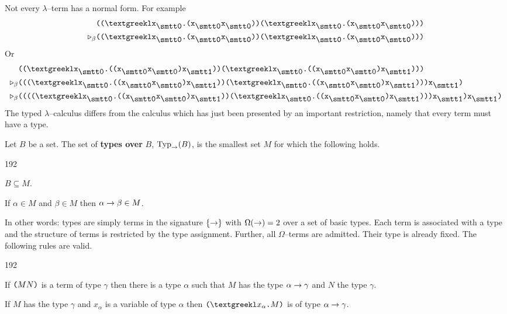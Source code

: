 Not every $\lambda$--term has a normal form. For example
\begin{align}
& \mbox{\tt ((\stlambda x$_{\snull}$.(x$_{\snull}$x$_{\snull}$%
))(\stlambda x$_{\snull}$.(x$_{\snull}$x$_{\snull}$)))} \\\notag
\triangleright_{\beta} & 
\mbox{\tt ((\stlambda x$_{\snull}$.(x$_{\snull}$x$_{\snull}$%
))({\stlambda}x$_{\snull}$.(x$_{\snull}$x$_{\snull}$)))}
\end{align}
Or
\begin{align}
 & \mbox{\tt (({\stlambda}x$_{\snull}$.((x$_{\snull}$x$_{\snull}$%
)x$_{\seins}$))({\stlambda}x$_{\snull}$.((x$_{\snull}$x$_{\snull}$%
)x$_{\seins}$)))}
\\\notag
\triangleright_{\beta} &
\mbox{\tt ((({\stlambda}x$_{\snull}$.((x$_{\snull}$x$_{\snull}$%
)x$_{\seins}$))({\stlambda}x$_{\snull}$.((x$_{\snull}$x$_{\snull}$%
)x$_{\seins}$)))x$_{\seins}$)}
\\\notag
\triangleright_{\beta} &
\mbox{\tt (((({\stlambda}x$_{\snull}$.((x$_{\snull}$x$_{\snull}$%
)x$_{\seins}$))({\stlambda}x$_{\snull}$.((x$_{\snull}$x$_{\snull}$%
)x$_{\seins}$)))x$_{\seins}$)x$_{\seins}$)}
\end{align}
The typed $\lambda$--calculus differs from the calculus which has
just been presented by an important restriction, namely that every
term must have a type.
\begin{defn}
Let $B$ be a set. The set of \textbf{types over} $B$,
$\operatorname{Typ}_{\rightarrow}(B)$, is the smallest set $M$ for which
the following holds.
\begin{dingautolist}{192}
\item $B \subseteq M$.
\item If $\alpha \in M$ and $\beta \in M$ then $\alpha \rightarrow \beta
    \in M$.
\end{dingautolist}
\end{defn}
In other words: types are simply terms in the signature
$\{\rightarrow\}$ with $\Omega(\rightarrow) = 2$ over a set of basic types.
Each term is associated with a type and the structure of terms
is restricted by the type assignment. Further, all $\Omega$--terms
are admitted. Their type is already fixed. The following rules
are valid.
\begin{dingautolist}{192}
\item
If $\mbox{\tt (}MN\mbox{\tt )}$ is a term of type $\gamma$ then
there is a type $\alpha$ such that $M$ has the type
$\alpha \rightarrow \gamma$ and $N$ the type $\gamma$.
\item
If $M$ has the type $\gamma$ and $x_{\alpha}$ is a variable of
type $\alpha$ then $\mbox{\tt (\stlambda} x_{\alpha} \mbox{\tt
.}M\mbox{\tt )}$ is of type $\alpha \rightarrow \gamma$.
\end{dingautolist}
